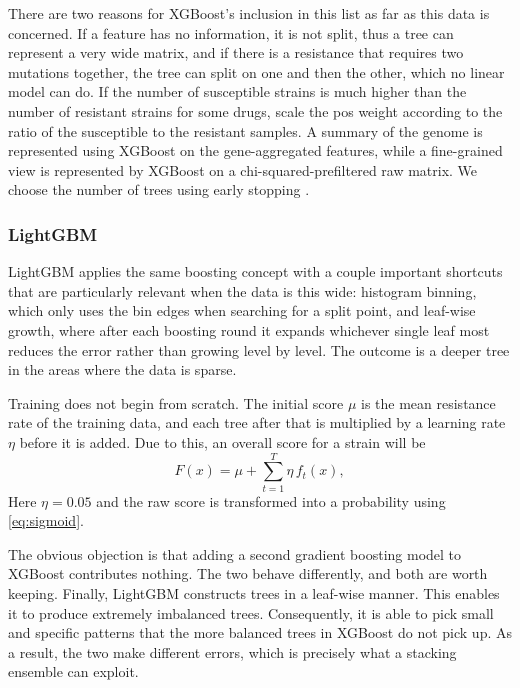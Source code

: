 \documentclass[journal]{IEEEtran}
\begin{document}
There are two reasons for XGBoost's inclusion in this list as far as this data is
concerned. If a feature has no information, it is not split, thus a tree can
represent a very wide matrix, and if there is a resistance that requires two
mutations together, the tree can split on one and then the other, which no linear
model can do. If the number of susceptible strains is much higher than the number of
resistant strains for some drugs, scale the pos weight according to the ratio of the
susceptible to the resistant samples. A summary of the genome is represented using
XGBoost on the gene-aggregated features, while a fine-grained view is represented by
XGBoost on a chi-squared-prefiltered raw matrix. We choose the number of trees using
early stopping \cite{prechelt1998earlystopping}.

\subsubsection{LightGBM}
LightGBM \cite{ke2017lightgbm} applies the same boosting concept with a couple
important shortcuts that are particularly relevant when the data is this wide:
histogram binning, which only uses the bin edges when searching for a split point,
and leaf-wise growth, where after each boosting round it expands whichever single
leaf most reduces the error rather than growing level by level. The outcome is a
deeper tree in the areas where the data is sparse.

Training does not begin from scratch. The initial score $\mu$ is the mean resistance
rate of the training data, and each tree after that is multiplied by a learning rate
$\eta$ before it is added. Due to this, an overall score for a strain will be
\begin{equation}
F(x) = \mu + \sum_{t=1}^{T} \eta\, f_t(x),
\label{eq:lgbm_score}
\end{equation}
Here $\eta = 0.05$ and the raw score is transformed into a probability using
\eqref{eq:sigmoid}.

The obvious objection is that adding a second gradient boosting model to XGBoost
contributes nothing. The two behave differently, and both are worth keeping. Finally, LightGBM
constructs trees in a leaf-wise manner. This enables it to produce extremely
imbalanced trees. Consequently, it is able to pick small and specific patterns that
the more balanced trees in XGBoost do not pick up. As a result, the two make
different errors, which is precisely what a stacking ensemble can exploit.
\end{document}
